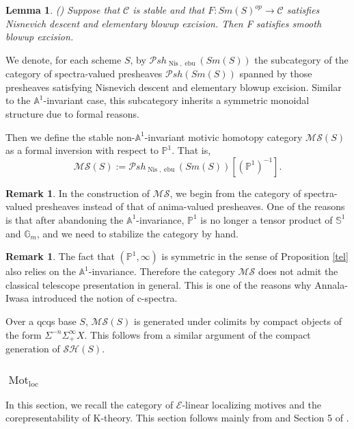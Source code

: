 \documentclass{article}
\newtheorem{lm}[thm]{Lemma}
\theoremstyle{definition}
\newtheorem{rmk}[thm]{Remark}
\newcommand{\on}{\operatorname}
\begin{document}
\begin{lm}(\cite[Proposition 2.2]{AHI})
Suppose that $\mathcal{C}$ is stable and that $F: Sm(S)^{op} \rightarrow \mathcal{C}$ satisfies Nisnevich descent and elementary blowup excision. Then F satisfies smooth blowup excision.
\end{lm}
We denote, for each scheme $S$, by $\mathcal{P}sh_{\on{Nis},\on{ebu}}(Sm(S))$ the subcategory of the category of spectra-valued presheaves $\mathcal{P}sh(Sm(S))$ spanned by those presheaves satisfying Nisnevich descent and elementary blowup excision. Similar to the $\mathbb{A}^1$-invariant case, this subcategory inherits a symmetric monoidal structure due to formal reasons.


Then we define the stable non-$\mathbb{A}^1$-invariant motivic homotopy category $\mathcal{MS}(S)$ as a formal inversion with respect to $\mathbb{P}^1$. That is,
\[\mathcal{MS}(S):=\mathcal{P}sh_{\on{Nis},\on{ebu}}(Sm(S))[(\mathbb{P}^1)^{-1}].\]
\begin{rmk}
In the construction of $\mathcal{MS}$, we begin from the category of spectra-valued presheaves instead of that of anima-valued presheaves. One of the reasons is that after abandoning the $\mathbb{A}^1$-invariance, $\mathbb{P}^1$ is no longer a tensor product of $\mathbb{S}^1$ and $\mathbb{G}_m$, and we need to stabilize the category by hand.
\end{rmk}
\begin{rmk}
The fact that $(\mathbb{P}^1,\infty)$ is symmetric in the sense of Proposition \ref{tel} also relies on the $\mathbb{A}^1$-invariance. Therefore the category $\mathcal{MS}$ does not admit the classical telescope presentation in general. This is one of the reasons why Annala-Iwasa introduced the notion of c-spectra.
\end{rmk}
Over a qcqs base $S$, $\mathcal{MS}(S)$ is generated under colimits by compact objects of the form $\Sigma^{-n}\Sigma^{\infty}_+X$. This follows from a similar argument of the compact generation of $\mathcal{SH}(S)$.





 
\subsubsection{$\on{Mot}_{\on{loc}}$}\label{E-linear.NC}
In this section, we recall the category of $\mathcal{E}$-linear localizing motives and the corepresentability of K-theory. This section follows mainly from \cite{BGT} and Section 5 of \cite{HSS}.
\end{document}

